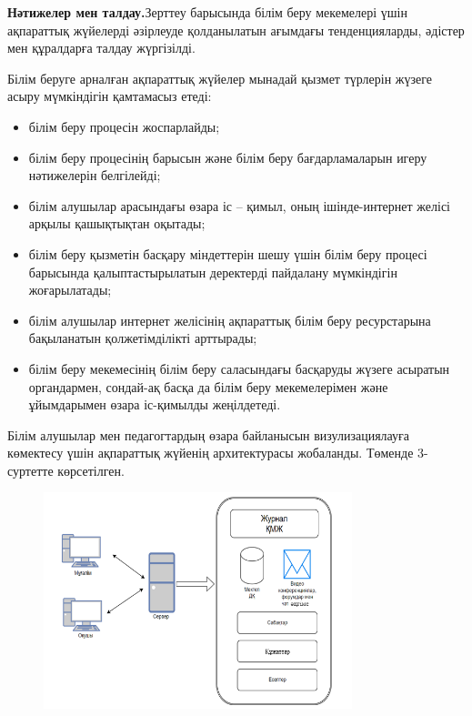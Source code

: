{\bfseries Нәтижелер мен талдау.}Зерттеу барысында білім беру мекемелері
үшін ақпараттық жүйелерді әзірлеуде қолданылатын ағымдағы
тенденцияларды, әдістер мен құралдарға талдау жүргізілді.

Білім беруге арналған ақпараттық жүйелер мынадай қызмет түрлерін жүзеге
асыру мүмкіндігін қамтамасыз етеді:

\begin{itemize}
\item
  білім беру процесін жоспарлайды;
\item
  білім беру процесінің барысын және білім беру бағдарламаларын игеру
  нәтижелерін белгілейді;
\item
  білім алушылар арасындағы өзара іс -- қимыл, оның ішінде-интернет
  желісі арқылы қашықтықтан оқытады;
\item
  білім беру қызметін басқару міндеттерін шешу үшін білім беру процесі
  барысында қалыптастырылатын деректерді пайдалану мүмкіндігін
  жоғарылатады;
\item
  білім алушылар интернет желісінің ақпараттық білім беру ресурстарына
  бақыланатын қолжетімділікті арттырады;
\item
  білім беру мекемесінің білім беру саласындағы басқаруды жүзеге
  асыратын органдармен, сондай-ақ басқа да білім беру мекемелерімен және
  ұйымдарымен өзара іс-қимылды жеңілдетеді.
\end{itemize}

Білім алушылар мен педагогтардың өзара байланысын визулизациялауға
көмектесу үшін ақпараттық жүйенің архитектурасы жобаланды. Төменде
3-суртетте көрсетілген.

\begin{figure}[H]
	\centering
	\includegraphics[width=0.8\textwidth]{media/ict/image101}
	\caption*{}
\end{figure}


